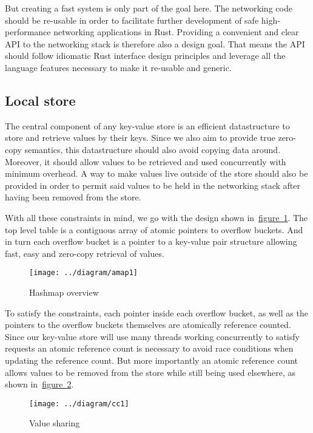 \documentclass[11pt]{article}
\begin{document}
But creating a fast system is only part of the goal here. The
networking code should be re-usable in order to facilitate further
development of safe high-performance networking
applications in Rust. Providing a convenient and clear API to the
networking stack is therefore also a design goal. That means the API
should follow idiomatic Rust interface design principles and leverage
all the language features necessary to make it re-usable and generic.

\subsection{Local store} \label{design-overview}

The central component of any key-value store is an efficient
datastructure to store and retrieve values by their keys. Since we
also aim to provide true zero-copy semantics, this datastructure
should also avoid copying data around. Moreover, it should allow
values to be retrieved and used concurrently with minimum overhead.
A way to make values live outside of the store should also be provided
in order to permit said values to be held in the networking stack
after having been removed from the store.

With all these constraints in mind, we go with the design shown
in~\hyperref[fig:hashmap]{figure~\ref{fig:hashmap}}. The top level
table is a contiguous array of atomic pointers to overflow
buckets. And in turn each overflow bucket is a pointer to a key-value
pair structure allowing fast, easy and zero-copy retrieval of values.

\begin{figure}[htb!]
  \texttt{[image: ../diagram/amap1]}
  \caption{Hashmap overview}
  \label{fig:hashmap}
\end{figure}

To satisfy the constraints, each pointer inside each overflow bucket,
as well as the pointers to the overflow buckets themselves are
atomically reference counted. Since our key-value store will use many
threads working concurrently to satisfy requests an atomic reference
count is necessary to avoid race conditions when updating the
reference count. But more importantly an atomic reference count allows
values to be removed from the store while still being used elsewhere,
as shown
in~\hyperref[fig:value-sharing]{figure~\ref{fig:value-sharing}}.

\begin{figure}[htb!]
  \texttt{[image: ../diagram/cc1]}
  \caption{Value sharing}
  \label{fig:value-sharing}
\end{figure}
\end{document}
